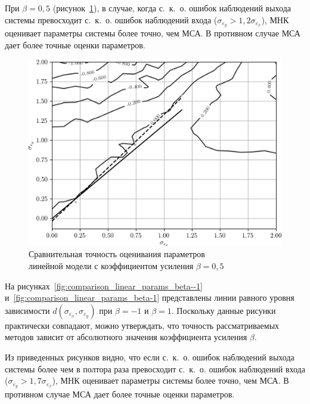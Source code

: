 При \( \beta = 0{,}5 \) (рисунок~\ref{fig:comparison_linear_params_beta-0,5}),
в случае, когда с.~к.~о. ошибок наблюдений выхода системы превосходит
с.~к.~о. ошибок наблюдений входа (\(\sigma_{\varepsilon_y} > 1{,}2 \sigma_{\varepsilon_x}\)),
МНК оценивает параметры системы более точно, чем МСА.
В противном случае МСА дает более точные оценки параметров.

\begin{figure}[h]
  \centering
  \includegraphics[width=135mm]{fig/linear/param/beta-0,5_param-accs-approx.png}
  \caption{%
    Сравнительная точность оценивания параметров \\
    линейной модели с коэффициентом усиления \( \beta = 0{,}5 \)
  }\label{fig:comparison_linear_params_beta-0,5}
\end{figure}

На рисунках~\ref{fig:comparison_linear_params_beta--1} и~\ref{fig:comparison_linear_params_beta-1}
представлены линии равного уровня зависимости \( d(\sigma_{\varepsilon_x}, \sigma_{\varepsilon_y}) \)
при \( \beta = -1 \) и \( \beta = 1 \).
Поскольку данные рисунки практически совпадают, можно утверждать, что точность рассматриваемых методов
зависит от абсолютного значения коэффициента усиления \( \beta \).

Из приведенных рисунков видно, что если с.~к.~о. ошибок наблюдений выхода системы
более чем в полтора раза превосходит с.~к.~о. ошибок наблюдений входа
(\( \sigma_{\varepsilon_y} > 1{,}7 \sigma_{\varepsilon_x} \)),
МНК оценивает параметры системы более точно, чем МСА.
В противном случае МСА дает более точные оценки параметров.

